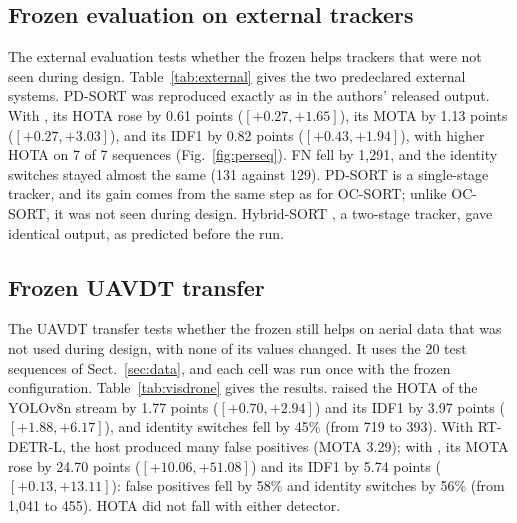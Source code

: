 \subsection{Frozen evaluation on external trackers}\label{sec:external}
The external evaluation tests whether the frozen \scl{} helps trackers that were not seen during
design. Table~\ref{tab:external} gives the two predeclared external systems. PD-SORT
\cite{wang2025pdsort} was reproduced exactly as in the authors' released output. With \scl{}, its
HOTA rose by 0.61 points ($[+0.27,+1.65]$), its MOTA by 1.13 points ($[+0.27,+3.03]$), and its IDF1
by 0.82 points ($[+0.43,+1.94]$), with higher HOTA on 7 of 7 sequences (Fig.~\ref{fig:perseq}). FN
fell by 1,291, and the identity switches stayed almost the same (131 against 129).
PD-SORT is a single-stage tracker, and its gain comes from the same step as for OC-SORT; unlike
OC-SORT, it was not seen during design. Hybrid-SORT \cite{yang2024hybridsort}, a two-stage tracker,
gave identical output, as predicted before the run.



\subsection{Frozen UAVDT transfer}\label{sec:visdrone}
The UAVDT transfer tests whether the frozen \scl{} still helps on aerial data that was not used
during design, with none of its values changed. It uses the 20 test sequences of
Sect.~\ref{sec:data}, and each cell was run once with the frozen configuration.
Table~\ref{tab:visdrone} gives the results. \scl{} raised the HOTA of the YOLOv8n stream by 1.77
points ($[+0.70,+2.94]$) and its IDF1 by 3.97 points ($[+1.88,+6.17]$), and identity switches fell
by 45\% (from 719 to 393). With RT-DETR-L, the host produced many false positives (MOTA 3.29); with
\scl{}, its MOTA rose by 24.70 points ($[+10.06,+51.08]$) and its IDF1 by 5.74 points
($[+0.13,+13.11]$): false positives fell by 58\% and identity switches by 56\% (from 1,041 to 455).
HOTA did not fall with either detector.


